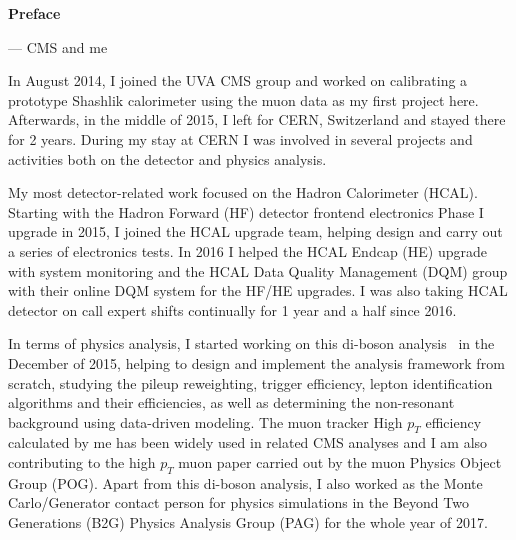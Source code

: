 \begin{center}
\textbf{\huge Preface}
\end{center}
\begin{flushright}
\Large{--- CMS and me}
\end{flushright}
\vspace{0.5cm}
In August 2014, I joined the UVA CMS group and worked on calibrating a prototype Shashlik calorimeter using the muon data as my first project here. Afterwards, in the middle of 2015, I left for CERN, Switzerland and stayed there for 2 years. During my stay at CERN I was involved in several projects and activities both on the detector and physics analysis. 

\vspace{0.3cm}
My most detector-related work focused on the Hadron Calorimeter (HCAL). Starting with the Hadron Forward (HF) detector frontend electronics Phase I upgrade in 2015, I joined the HCAL upgrade team, helping design and carry out a series of electronics tests. In 2016 I helped the HCAL Endcap (HE) upgrade with system monitoring and the HCAL Data Quality Management (DQM) group with their online DQM system for the HF/HE upgrades. I was also taking HCAL detector on call expert shifts continually for 1 year and a half since 2016.

\vspace{0.3cm}
In terms of physics analysis, I started working on this di-boson analysis~\cite{thispaper} in the December of 2015, helping to design and implement the analysis framework from scratch, studying the pileup reweighting, trigger efficiency, lepton identification algorithms and their efficiencies, as well as determining the non-resonant background using data-driven modeling. The muon tracker High $p_{T}$ efficiency calculated by me has been widely used in related CMS analyses and I am also contributing to the high $p_{T}$ muon paper carried out by the muon Physics Object Group (POG). Apart from this di-boson analysis, I also worked as the Monte Carlo/Generator contact person for physics simulations in the Beyond Two Generations (B2G) Physics Analysis Group (PAG) for the whole year of 2017.
